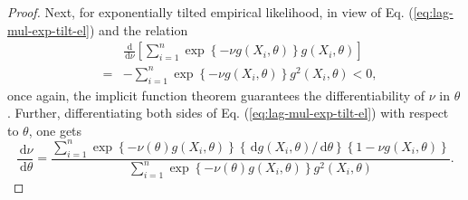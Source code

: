 \documentclass[oneside,english]{amsbook}
\numberwithin{section}{chapter}
\numberwithin{equation}{section}
\numberwithin{figure}{section}
\theoremstyle{plain}
\theoremstyle{plain}
\theoremstyle{definition}
\theoremstyle{plain}
\theoremstyle{plain}
\theoremstyle{remark}
\theoremstyle{definition}
\theoremstyle{definition}
\newcommand{\diff}{\,\mathrm{d}}
\begin{document}
\begin{proof}
Next, for exponentially tilted empirical likelihood, in view of Eq. (\ref{eq:lag-mul-exp-tilt-el})
and the relation 
\begin{eqnarray*}
 &  & \frac{\diff}{\diff\nu}\left[\sum_{i=1}^{n}\exp\left\{ -\nu g\left(X_{i},\theta\right)\right\} g\left(X_{i},\theta\right)\right]\\
 & = & -\sum_{i=1}^{n}\exp\left\{ -\nu g\left(X_{i},\theta\right)\right\} g^{2}\left(X_{i},\theta\right)<0,
\end{eqnarray*}
 once again, the implicit function theorem guarantees the differentiability
of $\nu$ in $\theta$. Further, differentiating both sides of Eq. (\ref{eq:lag-mul-exp-tilt-el})
with respect to $\theta$, one gets 
\begin{equation}
\frac{\diff\nu}{\diff\theta}=\frac{\sum_{i=1}^{n}\exp\left\{ -\nu\left(\theta\right)g\left(X_{i},\theta\right)\right\} \left\{ \diff g\left(X_{i},\theta\right)/\diff\theta\right\} \left\{ 1-\nu g\left(X_{i},\theta\right)\right\} }{\sum_{i=1}^{n}\exp\left\{ -\nu\left(\theta\right)g\left(X_{i},\theta\right)\right\} g^{2}\left(X_{i},\theta\right)}.\label{eq:first-deri-lag-mult-exp-tilted-el}
\end{equation}



\end{proof}
\end{document}
